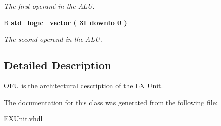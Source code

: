 \begin{DoxyCompactItemize}
\begin{DoxyCompactList}\small\item\em The first operand in the A\-L\-U. \end{DoxyCompactList}\item 
\hypertarget{class_e_x_unit_1_1_a_l_u___b_u_a5994cf9514855203a6cb1fa380cc53db}{\hyperlink{class_e_x_unit_1_1_a_l_u___b_u_a5994cf9514855203a6cb1fa380cc53db}{B} {\bfseries \textcolor{comment}{std\-\_\-logic\-\_\-vector}\textcolor{vhdlchar}{ }\textcolor{vhdlchar}{(}\textcolor{vhdlchar}{ } \textcolor{vhdldigit}{31} \textcolor{vhdlchar}{ }\textcolor{vhdlchar}{ }\textcolor{vhdlchar}{ }\textcolor{vhdlkeyword}{downto}\textcolor{vhdlchar}{ }\textcolor{vhdlchar}{ }\textcolor{vhdlchar}{ } \textcolor{vhdldigit}{0} \textcolor{vhdlchar}{ }\textcolor{vhdlchar}{)}\textcolor{vhdlchar}{ }} }\label{class_e_x_unit_1_1_a_l_u___b_u_a5994cf9514855203a6cb1fa380cc53db}

\begin{DoxyCompactList}\small\item\em The second operand in the A\-L\-U. \end{DoxyCompactList}\end{DoxyCompactItemize}


\subsection{Detailed Description}
O\-F\-U is the architectural description of the E\-X Unit. 

The documentation for this class was generated from the following file\-:\begin{DoxyCompactItemize}
\item 
\hyperlink{_e_x_unit_8vhdl}{E\-X\-Unit.\-vhdl}\end{DoxyCompactItemize}
